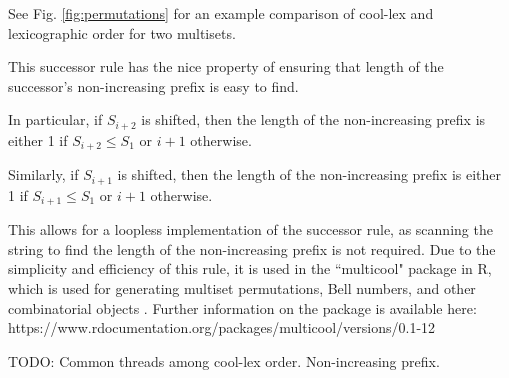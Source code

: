 See Fig. \ref{fig:permutations} for an example comparison of cool-lex and lexicographic order for two multisets.

This successor rule has the nice property of ensuring that length of the successor's non-increasing prefix is easy to find.

In particular, if $S_{i+2}$ is shifted, then the length of the non-increasing prefix is either 1 if $S_{i+2}\le S_1$ or $i+1$ otherwise. 

Similarly, if $S_{i+1}$ is shifted, then the length of the non-increasing prefix is either 1 if $S_{i+1}\le S_1$ or $i+1$ otherwise. 

This allows for a loopless implementation of the successor rule, as scanning the string to find the length of the non-increasing prefix is not required.  Due to the simplicity and efficiency of this rule, it is used in the ``multicool" package in R, which is used for generating multiset permutations, Bell numbers, and other combinatorial objects \cite{multicool_2021}.   Further information on the package is available here: https://www.rdocumentation.org/packages/multicool/versions/0.1-12

TODO: Common threads among cool-lex order. Non-increasing prefix. 



